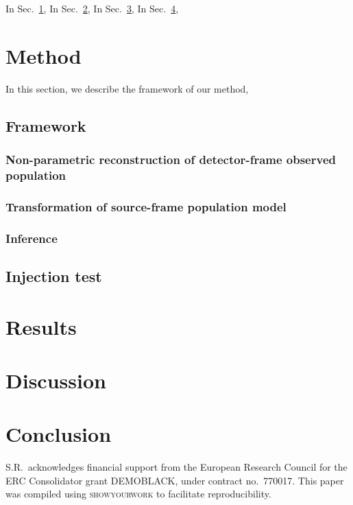 \documentclass[aps,prd,twocolumn,superscriptaddress,preprintnumbers,nofootinbib,hidelinks]{revtex4-2}
\begin{document}


In Sec.~\ref{sec:method},
In Sec.~\ref{sec:results},
In Sec.~\ref{sec:discussion},
In Sec.~\ref{sec:conclusion},

\section{Method}
\label{sec:method}

In this section, we describe the framework of our method, 

\subsection{Framework}
\label{sec:framework}

\subsubsection{Non-parametric reconstruction of detector-frame observed population}
\label{sec:reconstruction}

\subsubsection{Transformation of source-frame population model}
\label{sec:transformation}

\subsubsection{Inference}
\label{sec:inference}

\subsection{Injection test}
\label{sec:injection}

\section{Results}
\label{sec:results}

\section{Discussion}
\label{sec:discussion}

\section{Conclusion}
\label{sec:conclusion}

\begin{acknowledgments}

S.R.~acknowledges financial support from the European Research Council for the ERC Consolidator grant DEMOBLACK, under contract no.~770017.
This paper was compiled using \textsc{showyourwork} \cite{Luger2021} to facilitate reproducibility.

\end{acknowledgments}


\end{document}
